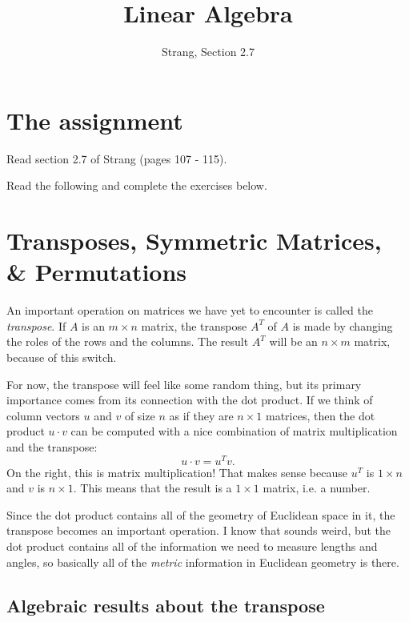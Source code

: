 \documentclass[11pt]{amsart}
\theoremstyle{definition}
\begin{document}
\title{Linear Algebra}
\author{Strang, Section 2.7}
\maketitle

\section{The assignment}
\begin{compactitem}
\item Read section 2.7 of Strang (pages 107 - 115).
\item Read the following and complete the exercises below.
\end{compactitem}


\section{Transposes, Symmetric Matrices, \& Permutations}

An important operation on matrices we have yet to encounter is called the \emph{transpose}. If $A$ is an $m\times n$ matrix, the transpose $A^T$ of $A$ is made by changing the roles of the rows and the columns. The result $A^T$ will be an $n \times m$ matrix, because of this switch.

For now, the transpose will feel like some random thing, but its primary importance comes from its connection with the dot product. If we think of column vectors $u$ and $v$ of size $n$ as if they are $n \times 1$ matrices, then the dot product $u \cdot v$ can be computed with a nice combination of matrix multiplication and the transpose:
\[
u \cdot v = u^T v .
\]
On the right, this is matrix multiplication! That makes sense because $u^T$ is $1 \times n$ and $v$ is $n \times 1$. This means that the result is a $1\times 1$ matrix, i.e. a number.


Since the dot product contains all of the geometry of Euclidean space in it, the transpose becomes an important operation. I know that sounds weird, but the dot product contains all of the information we need to measure lengths and angles, so basically all of the \emph{metric} information in Euclidean geometry is there.

\subsection{Algebraic results about the transpose}
\end{document}
